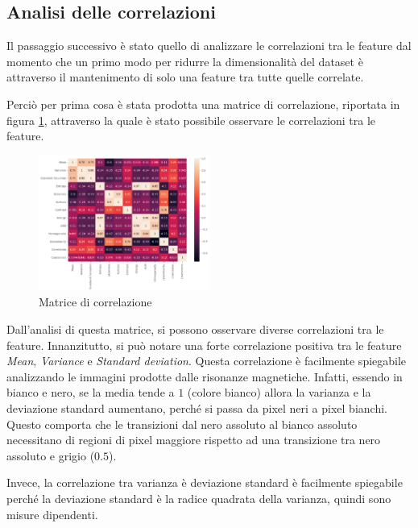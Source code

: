 \subsection{Analisi delle correlazioni} \label{sec:correlazione}
Il passaggio successivo è  stato quello di analizzare le correlazioni tra le
feature dal momento che un primo modo per ridurre la dimensionalità del dataset
è attraverso il mantenimento di solo una feature tra tutte quelle correlate.

Perciò per prima cosa è stata prodotta una matrice di correlazione, riportata in
figura \ref{fig:corr-matrix}, attraverso la quale è stato possibile osservare le
correlazioni tra le feature.
\begin{figure}[!ht]
      \centering
      \includegraphics[width=0.5\textwidth]{img/analisi/corr.png}
      \caption{Matrice di correlazione}
      \label{fig:corr-matrix}
\end{figure}

Dall'analisi di questa matrice, si possono osservare diverse correlazioni tra le
feature. Innanzitutto, si può notare una forte correlazione positiva tra le
feature \textit{Mean}, \textit{Variance} e \textit{Standard deviation}. Questa
correlazione è facilmente spiegabile analizzando le immagini prodotte dalle
risonanze magnetiche. Infatti, essendo in bianco e nero, se la media tende a $1$
(colore bianco) allora la varianza e la deviazione standard aumentano, perché si
passa da pixel neri a pixel bianchi. Questo comporta che le transizioni dal nero
assoluto al bianco assoluto necessitano di regioni di pixel maggiore rispetto
ad una transizione tra nero assoluto e grigio ($0.5$).

Invece, la correlazione tra varianza è deviazione standard è facilmente spiegabile
perché la deviazione standard è la radice quadrata della varianza, quindi sono
misure dipendenti.

